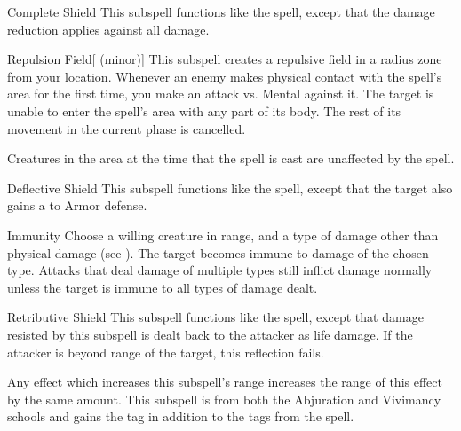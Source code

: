 \begin{ability}[\nth{2}]{Complete Shield}
This subspell functions like the  spell, except that the damage reduction applies against all damage.
\end{ability}
\vspace{0.25em}


\begin{ability}[\nth{2}]{Repulsion Field}[ (minor)]
This subspell creates a repulsive field in a \areamed radius zone from your location.
Whenever an enemy makes physical contact with the spell's area for the first time, you make an attack vs. Mental against it.
\hit The target is unable to enter the spell's area with any part of its body.
The rest of its movement in the current phase is cancelled.

Creatures in the area at the time that the spell is cast are unaffected by the spell.
\end{ability}
\vspace{0.25em}


\begin{ability}[\nth{3}]{Deflective Shield}
This subspell functions like the  spell, except that the target also gains a   to Armor defense.
\end{ability}
\vspace{0.25em}


\begin{ability}[\nth{3}]{Immunity}
Choose a willing creature in \rngclose range, and a type of damage other than physical damage (see ).
The target becomes immune to damage of the chosen type.
Attacks that deal damage of multiple types still inflict damage normally unless the target is immune to all types of damage dealt.
\end{ability}
\vspace{0.25em}


\begin{ability}[\nth{3}]{Retributive Shield}
This subspell functions like the  spell, except that damage resisted by this subspell is dealt back to the attacker as life damage.
If the attacker is beyond \rngclose range of the target, this reflection fails.

Any effect which increases this subspell's range increases the range of this effect by the same amount.
This subspell is from both the Abjuration and Vivimancy schools and gains the  tag in addition to the tags from the  spell.
\end{ability}
\vspace{0.25em}


